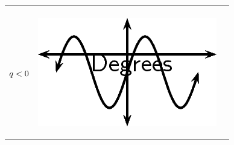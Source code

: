 \begin{center}
\begin{xtabular*}{\mytablewidth}[t]{|p{10\mystarwidth}|p{10\mystarwidth}|p{10\mystarwidth}|}
\begin{center}
    \end{center}



    \addtocounter{footnote}{-0}
    
     \tabularnewline{}
    
    
        
                  \begin{math}q<{}0\end{math}
                 &
    
    
        
                  
    \setcounter{subfigure}{0}

\label{m39414*id85421}
    \begin{center}
    \label{m39414*id85421!!!underscore!!!media}\label{m39414*id85421!!!underscore!!!printimage}\includegraphics{col11306.imgs/m39414_MG10C15_021.png} %
        
      \vspace{2pt}
    \vspace{.1in}
    
    \end{center}



    \addtocounter{footnote}{-0}
    
                 &
    
    

\end{xtabular*}
\end{center}
